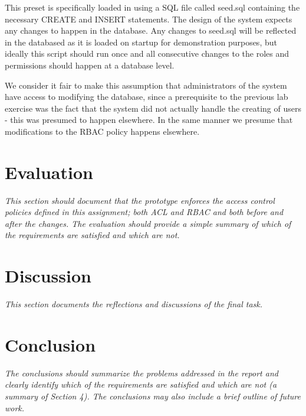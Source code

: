 \documentclass[12pt]{article}
\begin{document}
This preset is specifically loaded in using a SQL file called seed.sql containing the necessary CREATE and INSERT statements. The design of the system expects any changes to happen in the database. Any changes to seed.sql will be reflected in the databased as it is loaded on startup for demonstration purposes, but ideally this script should run once and all consecutive changes to the roles and permissions should happen at a database level.

We consider it fair to make this assumption that administrators of the system have access to modifying the database, since a prerequisite to the previous lab exercise was the fact that the system did not actually handle the creating of users - this was presumed to happen elsewhere. In the same manner we presume that modifications to the RBAC policy happens elsewhere.

\newpage

\section{Evaluation}
\label{sec:Evaluation}

\textit{This section should document that the prototype enforces the access control policies defined in this assignment; both ACL and RBAC and both before and after the changes. The evaluation should provide a simple summary of which of the requirements are satisfied and which are not.}



\newpage

\section{Discussion}
\label{sec:Discussion}

\textit{This section documents the reflections and discussions of the final task.}

\newpage

\section{Conclusion}
\label{sec:Conclusion}

\textit{The conclusions should summarize the problems addressed in the report and clearly identify which of the requirements are satisfied and which are not (a summary of Section 4). The conclusions may also include a brief outline of future work.}
\end{document}
